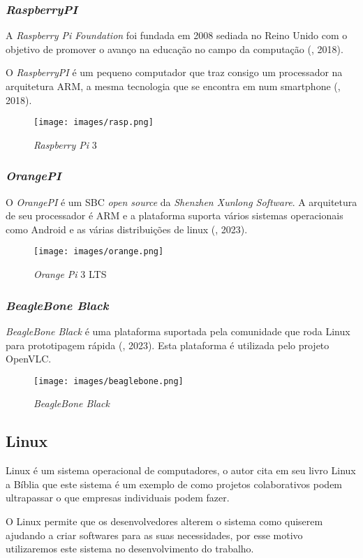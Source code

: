 \subsubsection{\textit{RaspberryPI}}

A \textit{Raspberry Pi Foundation} foi fundada em 2008 sediada no Reino Unido com o objetivo de promover o avanço na educação no campo da computação (\textit{\citeauthor{rasp}}, 2018).

O \textit{RaspberryPI} é um pequeno computador que traz consigo um processador na arquitetura ARM, a mesma tecnologia que se encontra em num smartphone (\textit{\citeauthor{rasp}}, 2018).

\begin{figure}[!htbp]
  \caption{\textit{Raspberry Pi} 3}
  \texttt{[image: images/rasp.png]}
  \label{figura:rasp}
\end{figure}

\subsubsection{\textit{OrangePI}}

O \textit{OrangePI} é um SBC \textit{open source} da \textit{Shenzhen Xunlong Software}. A arquitetura de seu processador é ARM e a plataforma suporta vários sistemas operacionais como Android e as várias distribuições de linux (\textit{\citeauthor{orangepi}}, 2023).

\begin{figure}[!htbp]
  \caption{\textit{Orange Pi} 3 LTS}
  \texttt{[image: images/orange.png]}
  \label{figura:orange}
\end{figure}

\subsubsection{\textit{BeagleBone Black}}

\textit{BeagleBone Black} é uma plataforma suportada pela comunidade que roda Linux para prototipagem rápida (\textit{\citeauthor{beaglebone}}, 2023).
Esta plataforma é utilizada pelo projeto OpenVLC. 

\begin{figure}[!htbp]
  \caption{\textit{BeagleBone Black}}
  \texttt{[image: images/beaglebone.png]}
  \label{figura:beagle}
\end{figure}

\subsection{Linux}

Linux é um sistema operacional de computadores, o autor  cita em seu livro Linux a Bíblia que este sistema é um exemplo de como projetos colaborativos podem ultrapassar o que empresas individuais podem fazer.

O Linux permite que os desenvolvedores alterem o sistema como quiserem ajudando a criar softwares para as suas necessidades, por esse motivo utilizaremos este sistema no desenvolvimento do trabalho.
